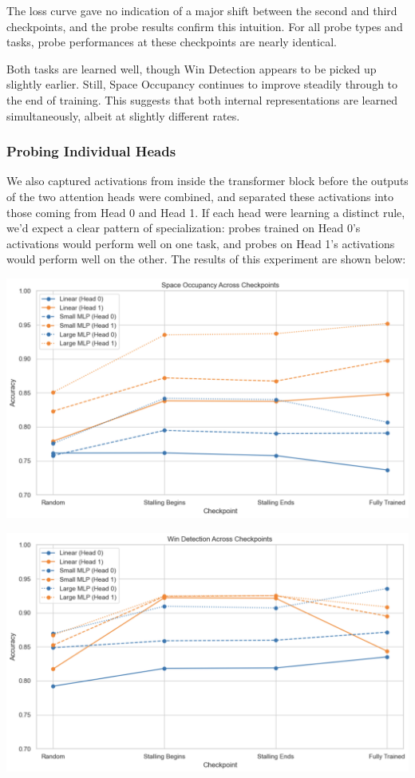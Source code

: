 \documentclass[11pt]{article}
\begin{document}
The loss curve gave no indication of a major shift between the second
and third checkpoints, and the probe results confirm this intuition. For
all probe types and tasks, probe performances at these checkpoints are
nearly identical.

Both tasks are learned well, though Win Detection appears to be picked
up slightly earlier. Still, Space Occupancy continues to improve
steadily through to the end of training. This suggests that both
internal representations are learned simultaneously, albeit at slightly
different rates.

    \subsubsection{Probing Individual Heads}\label{probing-individual-heads}

We also captured activations from inside the transformer block before
the outputs of the two attention heads were combined, and separated
these activations into those coming from Head 0 and Head 1. If each head
were learning a distinct rule, we'd expect a clear pattern of
specialization: probes trained on Head 0's activations would perform
well on one task, and probes on Head 1's activations would perform well
on the other. The results of this experiment are shown below:

\begin{center}
\includegraphics[keepaspectratio]{inserted_images/so_two_head.png}
\end{center}

\begin{center}
\includegraphics[keepaspectratio]{inserted_images/wd_two_head.png}
\end{center}
\end{document}
